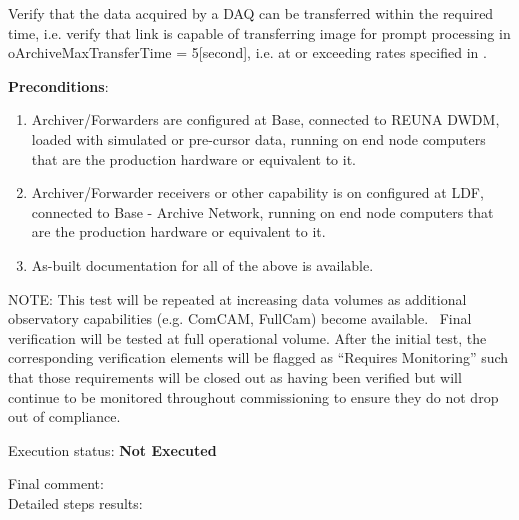 \documentclass[DM,lsstdraft,STR,toc]{lsstdoc}
\providecommand{\tightlist}{
  \setlength{\itemsep}{0pt}\setlength{\parskip}{0pt}}
\begin{document}
Verify that the data acquired by a DAQ can be transferred within the
required time, i.e. verify that link is capable of transferring image
for prompt processing in oArchiveMaxTransferTime = 5{[}second{]}, i.e.
at or exceeding rates specified in .

\textbf{ Preconditions}:\\
\begin{enumerate}
\tightlist
\item
  Archiver/Forwarders are configured at Base, connected to REUNA DWDM,
  loaded with simulated or pre-cursor data, running on end node
  computers that are the production hardware or equivalent to it.
\item
  Archiver/Forwarder receivers or other capability is on configured at
  LDF, connected to Base - Archive Network, running on end node
  computers that are the production hardware or equivalent to it.
\item
  As-built documentation for all of the above is available.
\end{enumerate}

NOTE: This test will be repeated at increasing data volumes as
additional observatory capabilities (e.g. ComCAM, FullCam) become
available. ~Final verification will be tested at full operational
volume. After the initial test, the corresponding verification elements
will be flagged as ``Requires Monitoring'' such that those requirements
will be closed out as having been verified but will continue to be
monitored throughout commissioning to ensure they do not drop out of
compliance.

Execution status: {\bf Not Executed }

Final comment:\\


Detailed steps results:
\end{document}
